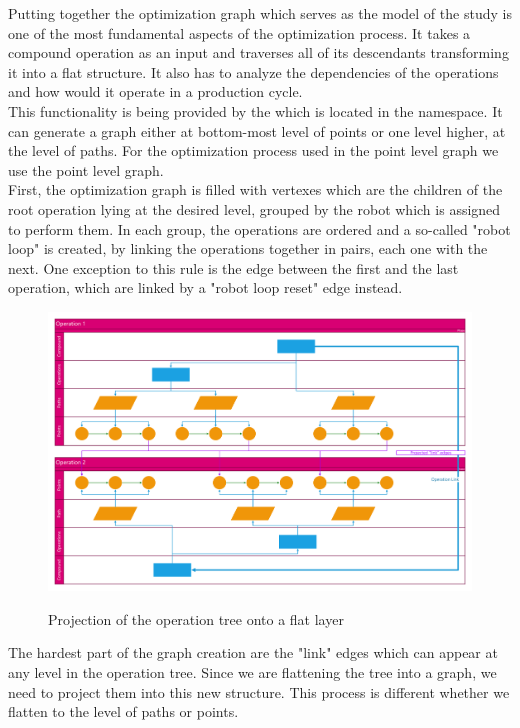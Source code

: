 Putting together the optimization graph which serves as the model of the study is one of the most fundamental aspects of the optimization process. It takes a compound operation as an input and traverses all of its descendants transforming it into a flat structure. It also has to analyze the dependencies of the operations and how would it operate in a production cycle. \\

This functionality is being provided by the  which is located in the  namespace. It can generate a graph either at bottom-most level of points or one level higher, at the level of paths. For the optimization process used in the point level graph we use the point level graph.\\

First, the optimization graph is filled with vertexes which are the children of the root operation lying at the desired level, grouped by the robot which is assigned to perform them. In each group, the operations are ordered and a so-called "robot loop" is created, by linking the operations together in pairs, each one with the next. One exception to this rule is the edge between the first and the last operation, which are linked by a "robot loop reset" edge instead. \\

\begin{figure}[ht]
	\caption{Projection of the operation tree onto a flat layer}
	\centering
	\includegraphics[width=1\textwidth]{graphprojection.pdf}
	\label{fig:GraphProjection}
\end{figure}

The hardest part of the graph creation are the "link" edges which can appear at any level in the operation tree. Since we are flattening the tree into a graph, we need to project them into this new structure. 
This process is different whether we flatten to the level of paths or points.  \\

